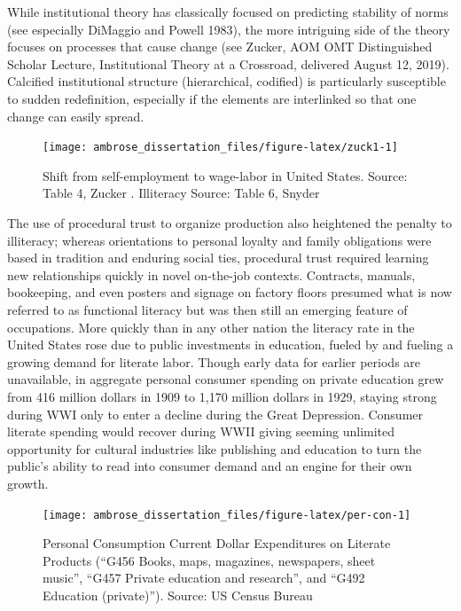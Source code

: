 \documentclass[]{book}
\theoremstyle{definition}
\theoremstyle{definition}
\theoremstyle{definition}
\theoremstyle{remark}
\begin{document}
While institutional theory has classically focused on predicting
stability of norms (see especially DiMaggio and Powell 1983), the more
intriguing side of the theory focuses on processes that cause change
(see Zucker, AOM OMT Distinguished Scholar Lecture, Institutional Theory
at a Crossroad, delivered August 12, 2019). Calcified institutional
structure (hierarchical, codified) is particularly susceptible to sudden
redefinition, especially if the elements are interlinked so that one
change can easily spread.





\begin{figure}

{\centering \texttt{[image: ambrose\_dissertation\_files/figure-latex/zuck1-1]} 

}

\caption{Shift from self-employment to wage-labor in United States.
Source: Table 4, Zucker \citeyearpar[15]{Zucker1983Organizations}.
Illiteracy Source: Table 6, Snyder \citeyearpar[21]{Snyder1993120}}\label{fig:zuck1}
\end{figure}

The use of procedural trust to organize production also heightened the
penalty to illiteracy; whereas orientations to personal loyalty and
family obligations were based in tradition and enduring social ties,
procedural trust required learning new relationships quickly in novel
on-the-job contexts. Contracts, manuals, bookeeping, and even posters
and signage on factory floors presumed what is now referred to as
functional literacy but was then still an emerging feature of
occupations. More quickly than in any other nation the literacy rate in
the United States rose due to public investments in education, fueled by
and fueling a growing demand for literate labor. Though early data for
earlier periods are unavailable, in aggregate personal consumer spending
on private education grew from 416 million dollars in 1909 to 1,170
million dollars in 1929, staying strong during WWI only to enter a
decline during the Great Depression. Consumer literate spending would
recover during WWII giving seeming unlimited opportunity for cultural
industries like publishing and education to turn the public's ability to
read into consumer demand and an engine for their own growth.







\begin{figure}

{\centering \texttt{[image: ambrose\_dissertation\_files/figure-latex/per-con-1]} 

}

\caption{Personal Consumption Current Dollar Expenditures on
Literate Products (``G456 Books, maps, magazines, newspapers, sheet
music'', ``G457 Private education and research'', and ``G492 Education
(private)''). Source: US Census Bureau
\citeyearpar[316-319]{Bureau1975Historical}}\label{fig:per-con}
\end{figure}
\end{document}
